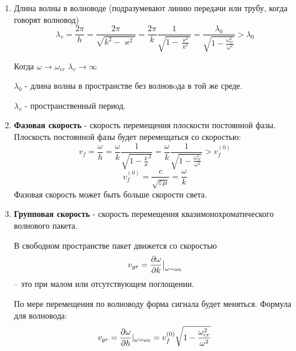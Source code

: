 \documentclass[a4paper,14pt]{extarticle}
\renewcommand{\kappa}{\varkappa}
\begin{document}
\begin{enumerate}
	
	\item Длина волны в волноводе (подразумевают линию передачи или трубу, когда говорят волновод)
	\begin{equation*}
	\lambda_v = \frac{2 \pi}{h} = \frac{2 \pi}{\sqrt{k^2 - \kappa^2}} = \frac{2 \pi}{k} \frac{1}{\sqrt{1 - \frac{\kappa^2}{k^2}}} = \frac{\lambda_0}{\sqrt{1 - \frac{\omega_{cr}^2}{\omega^2}}} > \lambda_0
	\end{equation*}
	
	Когда $\omega \rightarrow \omega_{cr}$	$\lambda_{v} \rightarrow \infty$
	
	$\lambda_0$ - длина волны в пространстве без волновoда в той же среде.
	
	$\lambda_{v}$ - пространственный период.
	
	\item \textbf{Фазовая скорость} - скорость перемещения плоскости постоянной фазы.
	Плоскость постоянной фазы будет перемещаться со скоростью:
	\begin{equation*}
	v_f =\frac{\omega}{h}= 
	\frac{\omega}{k} \frac{1}{\sqrt{1 - {\frac{k}{\kappa}^2}}} = \frac{\omega}{k} \frac{1}{\sqrt{1 - {\frac{\omega_{cr}^2}{\omega^2}}}} > v_f^{(0)}
	\end{equation*}
	\begin{equation*}
	v_f^{(0)} = \frac{c}{\sqrt{\varepsilon \mu}} = \frac{\omega}{k}
	\end{equation*}
	Фазовая скорость может быть больше скорости света.
	
	\item \textbf{Групповая скорость} - скорость перемещения квазимонохроматического волнового пакета. 	
	
	В свободном пространстве пакет движется со скоростью 
	\begin{equation}
		v_{gr} = \pdv{\omega}{k}\big|_{\omega = \omega_{0}}
	\end{equation} -- это при малом или отсутствующем поглощении.
	
	По мере перемещения по волноводу форма сигнала будет меняться. Формула для волновода:	
	\begin{equation}
		v_{gr} = \pdv{\omega}{h}\vert_{\omega = \omega_{0}} = v_f^{(0)}\sqrt{1 - {\frac{\omega_{cr}^2}{\omega^2}}}
	\end{equation}   
	
\end{enumerate}
\end{document}
